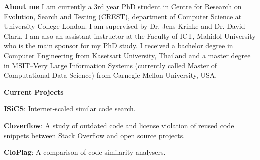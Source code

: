 \documentclass[a4paper,12pt,final]{memoir}
\newcommand{\Sep}{\vspace{1.5em}}
\newcommand{\SmallSep}{\vspace{0.5em}}
\newenvironment{AboutMe}
	{\ignorespaces\textbf{\color{RoyalBlue} About me}}
	{\Sep\ignorespacesafterend}
\newcommand{\CVSection}[1]
	{\Large\textbf{#1}\par
	\SmallSep\normalsize\normalfont}
\newcommand{\CVItem}[1]
	{\textbf{\color{RoyalBlue} #1}}
\begin{document}
\normalsize\normalfont

\begin{AboutMe}
I am currently a 3rd year PhD student 
in Centre for Research on Evolution, Search and Testing (CREST), department of Computer Science at University College London. I am supervised by Dr. Jens Krinke and Dr. David Clark.
\newline \newline
I am also an assistant instructor at the Faculty of ICT, Mahidol University who is the main sponsor for my PhD study.
\newline \newline
I received a bachelor degree in Computer Engineering from Kasetsart University, Thailand and a master degree in MSIT--Very Large Information Systems (currently called Master of Computational Data Science) from Carnegie Mellon University, USA.
\end{AboutMe}

\CVSection{Current Projects}
\begin{compactitem}[\color{RoyalBlue}$\circ$]
	\item \CVItem{ISiCS}: Internet-scaled similar code search.
	\item \CVItem{Cloverflow}: A study of outdated code and license violation of reused code snippets between Stack Overflow and open source projects.
	\item \CVItem{CloPlag}: A comparison of code similarity analysers.
\end{compactitem}
\SmallSep
\end{document}
